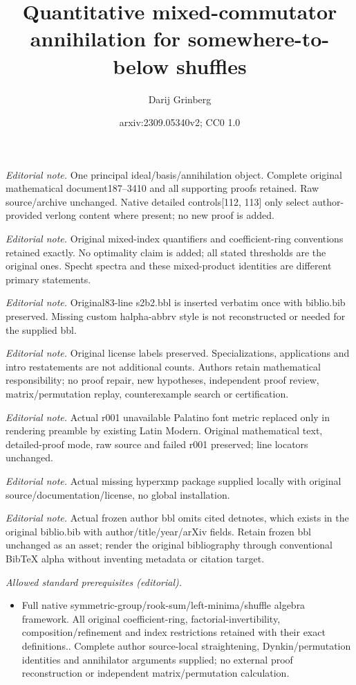 \documentclass[numbers=enddot,12pt,final,onecolumn,notitlepage]{scrartcl}%
\title{Quantitative mixed-commutator annihilation for somewhere-to-below shuffles}
\author{Darij Grinberg}
\date{arxiv:2309.05340v2; CC0 1.0}
\theoremstyle{definition}
\begin{document}
\maketitle
\noindent\textit{Editorial note.} One principal ideal/basis/annihilation object. Complete original mathematical document187--3410 and all supporting proofs retained. Raw source/archive unchanged. Native detailed controls[112, 113] only select author-provided verlong content where present; no new proof is added.\par\medskip
\noindent\textit{Editorial note.} Original mixed-index quantifiers and coefficient-ring conventions retained exactly. No optimality claim is added; all stated thresholds are the original ones. Specht spectra and these mixed-product identities are different primary statements.\par\medskip
\noindent\textit{Editorial note.} Original83-line s2b2.bbl is inserted verbatim once with biblio.bib preserved. Missing custom halpha-abbrv style is not reconstructed or needed for the supplied bbl.\par\medskip
\noindent\textit{Editorial note.} Original license labels preserved. Specializations, applications and intro restatements are not additional counts. Authors retain mathematical responsibility; no proof repair, new hypotheses, independent proof review, matrix/permutation replay, counterexample search or certification.\par\medskip
\noindent\textit{Editorial note.} Actual r001 unavailable Palatino font metric replaced only in rendering preamble by existing Latin Modern. Original mathematical text, detailed-proof mode, raw source and failed r001 preserved; line locators unchanged.\par\medskip
\noindent\textit{Editorial note.}  Actual missing hyperxmp package supplied locally with original source/documentation/license, no global installation.\par\medskip
\noindent\textit{Editorial note.} Actual frozen author bbl omits cited detnotes, which exists in the original biblio.bib with author/title/year/arXiv fields. Retain frozen bbl unchanged as an asset; render the original bibliography through conventional BibTeX alpha without inventing metadata or citation target.\par\medskip
\noindent\textit{Allowed standard prerequisites (editorial).}\begin{itemize}
\item Full native symmetric-group/rook-sum/left-minima/shuffle algebra framework. All original coefficient-ring, factorial-invertibility, composition/refinement and index restrictions retained with their exact definitions.. Complete author source-local straightening, Dynkin/permutation identities and annihilator arguments supplied; no external proof reconstruction or independent matrix/permutation calculation.
\end{itemize}\medskip
\end{document}
